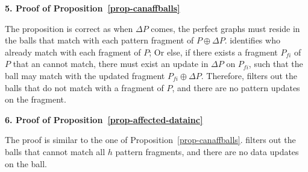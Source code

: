 
\noindent
{\textbf{5. Proof of Proposition~\ref{prop-canaffballs}}}

The proposition is correct as when $\Delta P$ comes, the perfect graphs must reside in the balls that match with each pattern fragment of $P\oplus \Delta P$.
\identifyaffball identifies \affballsx who already match with each fragment of $P$;
Or else, if there exists a fragment $P_{fi}$ of $P$ that an \affballx cannot match,
there must exist an update in $\Delta P$ on $P_{fi}$,
such that the ball may match with the updated fragment $P_{fi}\oplus \Delta P$.
Therefore, \identifyaffball filters out the balls that do not match with a fragment of $P$, and there are no pattern updates on the fragment.

\noindent
{\textbf{6. Proof of Proposition~\ref{prop-affected-datainc}}}
	
The proof is similar to the one of Proposition~\ref{prop-canaffballs}.
\identifyaffball filters out the balls that cannot match all $h$ pattern fragments,	and there are no data updates on the ball.


